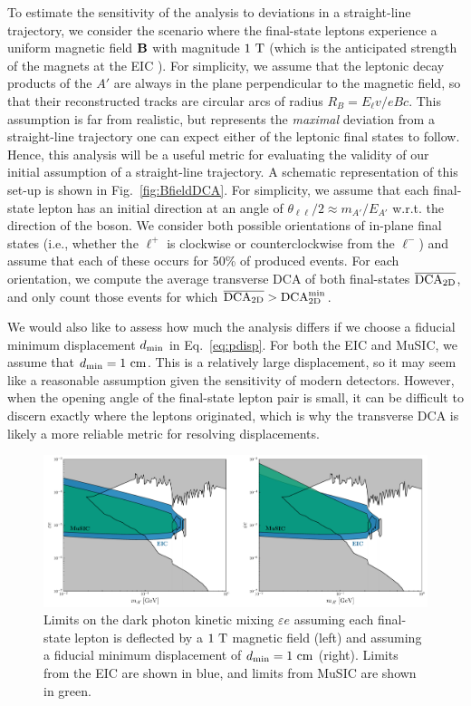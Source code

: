 To estimate the sensitivity of the analysis to deviations in a straight-line trajectory, we consider the scenario where the final-state leptons experience a uniform magnetic field ${\bf B}$ with magnitude $1~{\rm T}$ (which is the anticipated strength of the magnets at the EIC \cite{Adkins:2022jfp}). For simplicity, we assume that the leptonic decay products of the $A'$ are always in the plane perpendicular to the magnetic field, so that their reconstructed tracks are circular arcs of radius $R_B = E_\ell v/eBc$. This assumption is far from realistic, but represents the {\it maximal} deviation from a straight-line trajectory one can expect either of the leptonic final states to follow. Hence, this analysis will be a useful metric for evaluating the validity of our initial assumption of a straight-line trajectory. A schematic representation of this set-up is shown in Fig.~\ref{fig:BfieldDCA}. For simplicity, we assume that each final-state lepton has an initial direction at an angle of $\theta_{\ell\ell}/2 \approx m_{A'}/E_{A'}$ w.r.t. the direction of the boson. We consider both possible orientations of in-plane final states (i.e., whether the $\ell^+$ is clockwise or counterclockwise from the $\ell^-$) and assume that each of these occurs for 50\% of produced events. For each orientation, we compute the average transverse DCA of both final-states  $\overline{{\rm DCA}_{\rm 2D}}$, and only count those events for which $\overline{{\rm DCA}_{\rm 2D}} > {\rm DCA}_{\rm 2D}^{\rm min}$. 


We would also like to assess how much the analysis differs if we choose a fiducial minimum displacement $d_{\rm min}$ in Eq.~\ref{eq:pdisp}. For both the EIC and MuSIC, we assume that $d_{\rm min} = 1~{\rm cm}$. This is a relatively large displacement, so it may seem like a reasonable assumption given the sensitivity of modern detectors. However, when the opening angle of the final-state lepton pair is small, it can be difficult to discern exactly where the leptons originated, which is why the transverse DCA is likely a more reliable metric for resolving displacements.


\begin{figure}[t!]
    \centering
    \includegraphics[width=\linewidth]{figures/chapter6/dark_bosons_B_field_analysis.pdf}
    \caption[Limits on the dark photon kinetic mixing $\varepsilon e$ under different analyses.]{Limits on the dark photon kinetic mixing $\varepsilon e$ assuming each final-state lepton is deflected by a $1~{\rm T}$ magnetic field (left) and assuming a fiducial minimum displacement of $d_{\rm min} = 1~{\rm cm}$ (right). Limits from the EIC are shown in blue, and limits from MuSIC are shown in green.}
    \label{fig:alt_analysis}
\end{figure}

